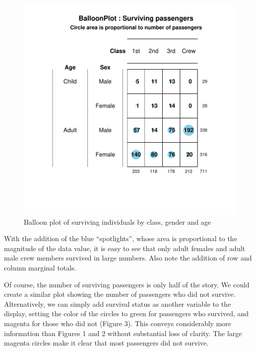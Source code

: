 \documentclass[a4paper]{report}
\begin{document}
\begin{article}
\begin{figure}
\includegraphics[width=\textwidth]{Figure2.pdf}
\caption{\label{figure:Figure2}
Balloon plot of surviving individuals by class, gender and age }
\end{figure}

With the addition of the blue ``spotlights'', whose area is
proportional to the magnitude of the data value, it is easy to see
that only adult females and adult male crew members survived in
large numbers.  Also note the addition of row and column marginal
totals.

Of course, the number of surviving passengers is only half of the
story.  We could create a similar plot showing the number of
passengers who did not survive.  Alternatively, we can simply add
survival status as another variable to the display, setting the
color of the circles to green for passengers who survived, and
magenta for those who did not (Figure 3).  This conveys considerably
more information than Figures 1 and 2 without substantial loss of
clarity. The large magenta circles make it clear that most
passengers did not survive.



\end{article}
\end{document}
